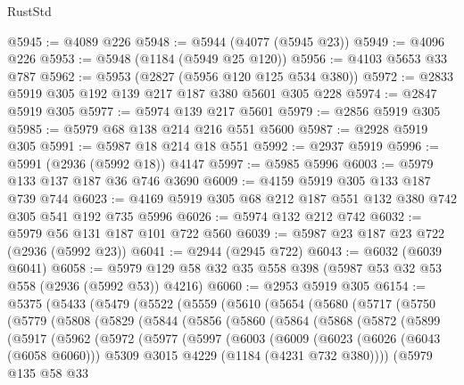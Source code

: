 \begin{lexlean}{RustStd}
\begin{coremodule}
@5945 := @4089 @226
@5948 := @5944 (@4077 (@5945 @23))
@5949 := @4096 @226
@5953 := @5948 (@1184 (@5949 @25 @120))
@5956 := @4103 @5653 @33 @787
@5962 := @5953 (@2827 (@5956 @120 @125 @534 @380))
@5972 := @2833 @5919 @305 @192 @139 @217 @187 @380 @5601 @305 @228
@5974 := @2847 @5919 @305
@5977 := @5974 @139 @217 @5601
@5979 := @2856 @5919 @305
@5985 := @5979 @68 @138 @214 @216 @551 @5600
@5987 := @2928 @5919 @305
@5991 := @5987 @18 @214 @18 @551
@5992 := @2937 @5919
@5996 := @5991 (@2936 (@5992 @18)) @4147
@5997 := @5985 @5996
@6003 := @5979 @133 @137 @187 @36 @746 @3690
@6009 := @4159 @5919 @305 @133 @187 @739 @744
@6023 := @4169 @5919 @305 @68 @212 @187 @551 @132 @380 @742 @305 @541 @192 @735 @5996
@6026 := @5974 @132 @212 @742
@6032 := @5979 @56 @131 @187 @101 @722 @560
@6039 := @5987 @23 @187 @23 @722 (@2936 (@5992 @23))
@6041 := @2944 (@2945 @722)
@6043 := @6032 (@6039 @6041)
@6058 := @5979 @129 @58 @32 @35 @558 @398 (@5987 @53 @32 @53 @558 (@2936 (@5992 @53)) @4216)
@6060 := @2953 @5919 @305
@6154 := @5375
    (@5433
      (@5479
        (@5522
          (@5559
            (@5610
              (@5654
                (@5680
                  (@5717
                    (@5750
                      (@5779
                        (@5808
                          (@5829
                            (@5844
                              (@5856
                                (@5860
                                  (@5864
                                    (@5868
                                      (@5872
                                        (@5899
                                          (@5917
                                            (@5962
                                              (@5972
                                                (@5977
                                                  (@5997
                                                    (@6003
                                                      (@6009
                                                        (@6023
                                                          (@6026 (@6043 (@6058 @6060)))
                                                          @5309
                                                          @3015
                                                          @4229
                                                          (@1184 (@4231 @732 @380))))
                                                      (@5979
                                                        @135
                                                        @58
                                                        @33

\end{coremodule}
\end{lexlean}

